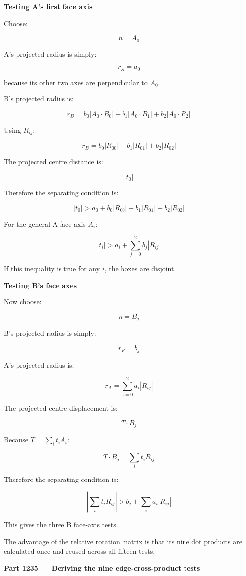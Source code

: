 \textbf{Testing A's first face axis}

Choose:

\[
n=A_0
\]

A's projected radius is simply:

\[
r_A=a_0
\]

because its other two axes are perpendicular to \(A_0\).

B's projected radius is:

\[
r_B= b_0|A_0\cdot B_0| + b_1|A_0\cdot B_1| + b_2|A_0\cdot B_2|
\]

Using \(R_{ij}\):

\[
\boxed{ r_B= b_0|R_{00}|+ b_1|R_{01}|+ b_2|R_{02}| }
\]

The projected centre distance is:

\[
|t_0|
\]

Therefore the separating condition is:

\[
\boxed{ |t_0|> a_0+b_0|R_{00}|+b_1|R_{01}|+b_2|R_{02}| }
\]

For the general A face axis \(A_i\):

\[
\boxed{ |t_i|> a_i+\sum_{j=0}^{2}b_j|R_{ij}| }
\]

If this inequality is true for any \(i\), the boxes are disjoint.

\textbf{Testing B's face axes}

Now choose:

\[
n=B_j
\]

B's projected radius is simply:

\[
r_B=b_j
\]

A's projected radius is:

\[
r_A=\sum_{i=0}^2a_i|R_{ij}|
\]

The projected centre displacement is:

\[
T\cdot B_j
\]

Because \(T=\sum_i t_iA_i\):

\[
T\cdot B_j=\sum_i t_iR_{ij}
\]

Therefore the separating condition is:

\[
\boxed{ \left|\sum_i t_iR_{ij}\right| > b_j+\sum_i a_i|R_{ij}| }
\]

This gives the three B face-axis tests.

The advantage of the relative rotation matrix is that its nine dot products are calculated once and reused across all fifteen tests.

\textbf{Part 1235 --- Deriving the nine edge-cross-product tests}

